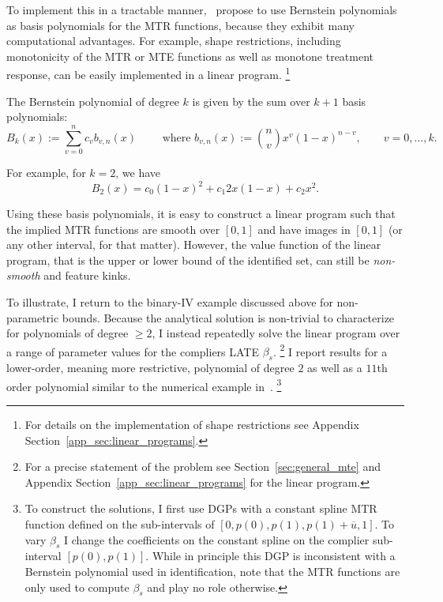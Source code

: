 \documentclass[12pt,a4paper,english]{article} %
\numberwithin{equation}{section}
\theoremstyle{definition}
\theoremstyle{remark}
\theoremstyle{plain}
\begin{document}
To implement this in a tractable manner,~\cite{mogstad2018using} propose to use Bernstein polynomials as basis polynomials for the MTR functions, because they exhibit many computational advantages.
For example, shape restrictions, including monotonicity of the MTR or MTE functions as well as monotone treatment response, can be easily implemented in a linear program.
\footnote{For details on the implementation of shape restrictions see Appendix Section~\ref{app_sec:linear_programs}.}

The Bernstein polynomial of degree $k$ is given by the sum over $k+1$ basis polynomials:
\begin{equation*}
  B_k(x) := \sum_{v=0}^n c_v b_{v,n}(x) \qquad \text{ where } b_{v,n}(x) := \binom{n}{v} x^v(1-x)^{n-v}, \qquad v = 0, \ldots, k.
\end{equation*}

For example, for $k=2$, we have
\begin{equation*}
  B_2(x) = c_0 (1-x)^2 + c_1 2x(1-x) + c_2 x^2.
\end{equation*}

Using these basis polynomials, it is easy to construct a linear program such that the implied MTR functions are smooth over $[0,1]$ and have images in $[0,1]$ (or any other interval, for that matter).
However, the value function of the linear program, that is the upper or lower bound of the identified set, can still be \textit{non-smooth} and feature kinks.

To illustrate, I return to the binary-IV example discussed above for non-parametric bounds.
Because the analytical solution is non-trivial to characterize for polynomials of degree $\geq2$, I instead repeatedly solve the linear program over a range of parameter values for the compliers LATE $\beta_s$.
\footnote{For a precise statement of the problem see Section~\ref{sec:general_mte} and Appendix Section~\ref{app_sec:linear_programs} for the linear program.}
I report results for a lower-order, meaning more restrictive, polynomial of degree $2$ as well as a $11$th order polynomial similar to the numerical example in~\cite{mogstad2018using}.
\footnote{
  To construct the solutions, I first use DGPs with a constant spline MTR function defined on the sub-intervals of $[0, p(0), p(1), p(1) + \overline{u}, 1]$.
  To vary $\beta_s$ I change the coefficients on the constant spline on the complier sub-interval $[p(0), p(1)]$.
  While in principle this DGP is inconsistent with a Bernstein polynomial used in identification,
  note that the MTR functions are only used to compute $\beta_s$ and play no role otherwise.
}
\end{document}
